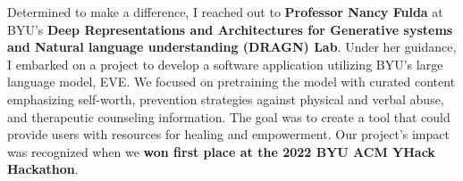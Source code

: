 \documentclass{article}
\begin{document}
Determined to make a difference, I reached out to \textbf{Professor Nancy Fulda} at BYU's \textbf{Deep Representations and Architectures for Generative systems and Natural language understanding (DRAGN) Lab}. Under her guidance, I embarked on a project to develop a software application utilizing BYU's large language model, EVE. We focused on pretraining the model with curated content emphasizing self-worth, prevention strategies against physical and verbal abuse, and therapeutic counseling information. The goal was to create a tool that could provide users with resources for healing and empowerment. Our project's impact was recognized when we \textbf{won first place at the 2022 BYU ACM YHack Hackathon}.
\\
\end{document}
